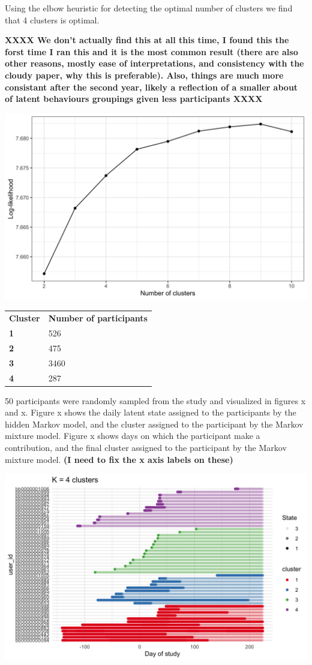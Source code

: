 \documentclass[
]{article}
\begin{document}
Using the elbow heuristic for detecting the optimal number of clusters
we find that 4 clusters is optimal.

\textbf{XXXX We don't actually find this at all this time, I found this
the forst time I ran this and it is the most common result (there are
also other reasons, mostly ease of interpretations, and consistency with
the cloudy paper, why this is preferable). Also, things are much more
consistant after the second year, likely a reflection of a smaller about
of latent behaviours groupings given less participants XXXX}

\includegraphics{images/elbow8.png}

\begin{longtable}[]{@{}ll@{}}
\toprule
\endhead
\textbf{Cluster} & \textbf{Number of participants} \\
\textbf{1} & 526 \\
\textbf{2} & 475 \\
\textbf{3} & 3460 \\
\textbf{4} & 287 \\
\bottomrule
\end{longtable}

50 participants were randomly sampled from the study and visualized in
figures x and x. Figure x shows the daily latent state assigned to the
participants by the hidden Markov model, and the cluster assigned to the
participant by the Markov mixture model. Figure x shows days on which
the participant make a contribution, and the final cluster assigned to
the participant by the Markov mixture model. \textbf{(I need to fix the
x axis labels on these)}

\includegraphics{images/y5.png}
\end{document}
